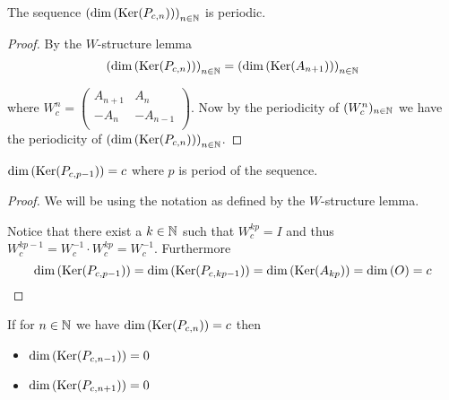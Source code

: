 \begin{proposition}
  The sequence $\left(\dim\left(\operatorname{Ker}(P_{c,n})\right)\right)_{n\in\mathbb{N}}$
  is periodic.
\end{proposition}

\begin{proof}
  By the $W$-structure lemma
  \[
  \left(\dim\left(\operatorname{Ker}(P_{c,n})\right)\right)_{n\in\mathbb{N}}
  =
  \left(\dim\left(\operatorname{Ker}(A_{n+1})\right)\right)_{n\in\mathbb{N}}
  \]

  where $W_{c}^{n}=\left(\begin{smallmatrix} A_{n+1} & A_{n}  \\ -A_{n} & -A_{n-1} \\\end{smallmatrix}\right)$.
  Now  by the periodicity of $(W_{c}^{n})_{n\in\mathbb{N}}$ we have the
  periodicity of
  $\left(\dim\left(\operatorname{Ker}(P_{c,n})\right)\right)_{n\in\mathbb{N}}$.
\end{proof}

\begin{lemma}
  $\dim\left(\operatorname{Ker}(P_{c,p-1})\right) = c$ where $p$ is period of the sequence.
\end{lemma}

\begin{proof}
  We will be using the notation as defined by the $W$-structure lemma.

  Notice that there exist a $k\in\mathbb{N}$ such that $W_{c}^{kp} = I$ and
  thus $W_{c}^{kp-1} = W_{c}^{-1} \cdot W_{c}^{kp} = W_{c}^{-1}$.
  Furthermore
  \[
  \dim\left(\operatorname{Ker}(P_{c,p-1})\right)
  =
  \dim\left(\operatorname{Ker}(P_{c,kp-1})\right)
  =
  \dim\left(\operatorname{Ker}(A_{kp})\right) = \dim\left(O\right)
  = c
  \]
\end{proof}

\begin{lemma}
  If for $n\in\mathbb{N}$ we have $\dim\left(\operatorname{Ker}(P_{c,n})\right) = c$ then
  \begin{itemize}
    \item $\dim\left(\operatorname{Ker}(P_{c,n-1})\right) = 0$
    \item $\dim\left(\operatorname{Ker}(P_{c,n+1})\right) = 0$
  \end{itemize}
\end{lemma}

